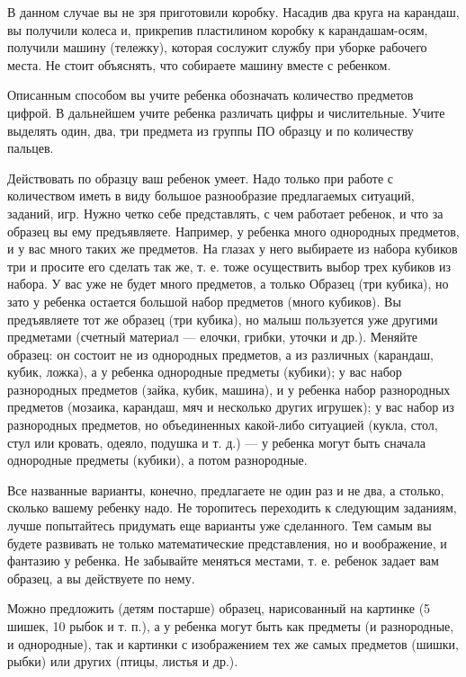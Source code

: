 \documentclass[a5paper]{book}
\begin{document}
В данном случае вы не зря приготовили коробку. Насадив два круга на
карандаш, вы получили колеса и, прикрепив пластилином коробку к
карандашам-осям, получили машину (тележку), которая сослужит службу при
уборке рабочего места. Не стоит объяснять, что собираете машину вместе с
ребенком.

Описанным способом вы учите ребенка обозначать количество предметов
цифрой. В дальнейшем учите ребенка различать цифры и числительные. Учите
выделять один, два, три предмета из группы ПО образцу и по количеству
пальцев.

Действовать по образцу ваш ребенок умеет. Надо только при работе с
количеством иметь в виду большое разнообразие предлагаемых ситуаций,
заданий, игр. Нужно четко себе представлять, с чем работает ребенок, и
что за образец вы ему предъявляете. Например, у ребенка много однородных
предметов, и у вас много таких же предметов. На глазах у него выбираете
из набора кубиков три и просите его сделать так же, т. е. тоже
осуществить выбор трех кубиков из набора. У вас уже не будет много
предметов, а только Образец (три кубика), но зато у ребенка остается
большой набор предметов (много кубиков). Вы предъявляете тот же образец
(три кубика), но малыш пользуется уже другими предметами (счетный
материал --- елочки, грибки, уточки и др.). Меняйте образец: он состоит
не из однородных предметов, а из различных (карандаш, кубик, ложка), а у
ребенка однородные предметы (кубики); у вас набор разнородных предметов
(зайка, кубик, машина), и у ребенка набор разнородных предметов
(мозаика, карандаш, мяч и несколько других игрушек); у вас набор из
разнородных предметов, но объединенных какой-либо ситуацией (кукла,
стол, стул или кровать, одеяло, подушка и т. д.) --- у ребенка могут
быть сначала однородные предметы (кубики), а потом разнородные.

Все названные варианты, конечно, предлагаете не один раз и не два, а
столько, сколько вашему ребенку надо. Не торопитесь переходить к
следующим заданиям, лучше попытайтесь придумать еще варианты уже
сделанного. Тем самым вы будете развивать не только математические
представления, но и воображение, и фантазию у ребенка. Не забывайте
меняться местами, т. е. ребенок задает вам образец, а вы действуете по
нему.

Можно предложить (детям постарше) образец, нарисованный на картинке (5
шишек, 10 рыбок и т. п.), а у ребенка могут быть как предметы (и
разнородные, и однородные), так и картинки с изображением тех же самых
предметов (шишки, рыбки) или других (птицы, листья и др.).
\end{document}
